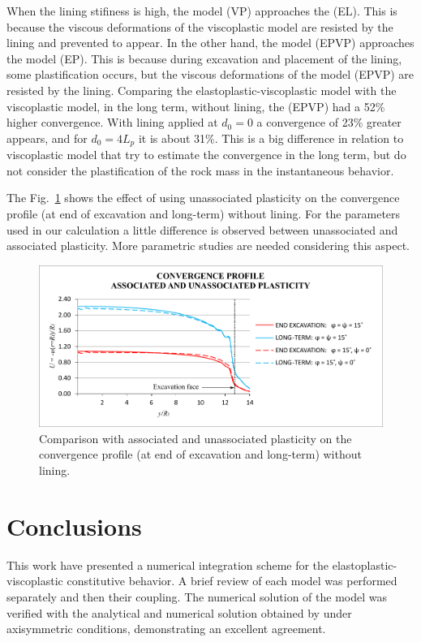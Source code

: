 \documentclass[Journal,letterpaper]{ascelike-new}
\begin{document}
When the lining stifiness is high, the model (VP) approaches the (EL). This is because the viscous deformations of the viscoplastic model are resisted by the lining and prevented to appear. In the other hand, the model (EPVP) approaches the model (EP). This is because during excavation and placement of the lining, some plastification occurs, but the viscous deformations of the model (EPVP) are resisted by the lining. Comparing the elastoplastic-viscoplastic  model with the viscoplastic model, in the long term, without lining, the (EPVP) had a 52\% higher convergence. With lining applied at $d_0=0$ a convergence of 23\% greater appears, and for $d_0=4L_p$ it is about 31\%. This is a big difference in relation to viscoplastic model that try to estimate the convergence in the long term, but do not consider the plastification of the rock mass in the instantaneous behavior.

The Fig.~\ref{unassociated_plasticity} shows the effect of using unassociated plasticity on the convergence profile (at end of excavation and long-term) without lining. For the parameters used in our calculation a little difference is observed between unassociated and associated plasticity. More parametric studies are needed considering this aspect.

\begin{figure}
	\centering
	\includegraphics[scale = 1.0]{FIG8.pdf}
	\caption{\label{unassociated_plasticity}Comparison with associated and unassociated plasticity on the convergence profile (at end of excavation and long-term) without lining.}
\end{figure}

\section{Conclusions}

This work have presented a numerical integration scheme for the elastoplastic-viscoplastic constitutive behavior. A brief review of each model was performed separately and then their coupling. The numerical solution of the model was verified with the analytical and numerical solution obtained by  under axisymmetric conditions, demonstrating an excellent agreement. 
\end{document}
